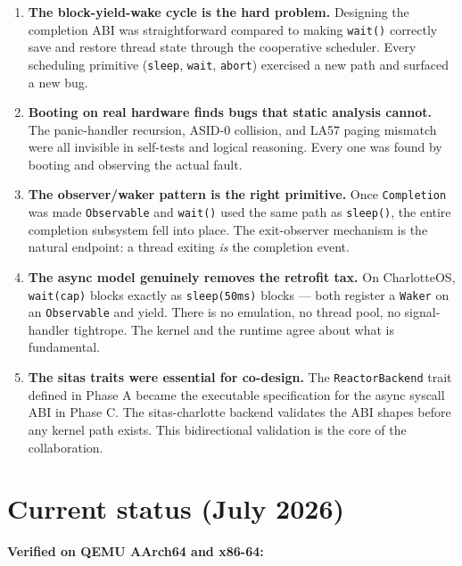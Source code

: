 \begin{enumerate}
    \item \textbf{The block-yield-wake cycle is the hard problem.} Designing
        the completion ABI was straightforward compared to making
        \texttt{wait()} correctly save and restore thread state through the
        cooperative scheduler. Every scheduling primitive (\texttt{sleep},
        \texttt{wait}, \texttt{abort}) exercised a new path and surfaced a new
        bug.

    \item \textbf{Booting on real hardware finds bugs that static analysis
        cannot.} The panic-handler recursion, ASID-0 collision, and LA57
        paging mismatch were all invisible in self-tests and logical reasoning.
        Every one was found by booting and observing the actual fault.

    \item \textbf{The observer/waker pattern is the right primitive.} Once
        \texttt{Completion} was made \texttt{Observable} and \texttt{wait()}
        used the same path as \texttt{sleep()}, the entire completion subsystem
        fell into place. The exit-observer mechanism is the natural endpoint:
        a thread exiting \emph{is} the completion event.

    \item \textbf{The async model genuinely removes the retrofit tax.} On
        CharlotteOS, \texttt{wait(cap)} blocks exactly as \texttt{sleep(50ms)}
        blocks --- both register a \texttt{Waker} on an \texttt{Observable} and
        yield. There is no emulation, no thread pool, no signal-handler
        tightrope. The kernel and the runtime agree about what is fundamental.

    \item \textbf{The sitas traits were essential for co-design.} The
        \texttt{ReactorBackend} trait defined in Phase A became the executable
        specification for the async syscall ABI in Phase C. The sitas-charlotte
        backend validates the ABI shapes before any kernel path exists. This
        bidirectional validation is the core of the collaboration.
\end{enumerate}

\section{Current status (July 2026)}

\textbf{Verified on QEMU AArch64 and x86-64:}

